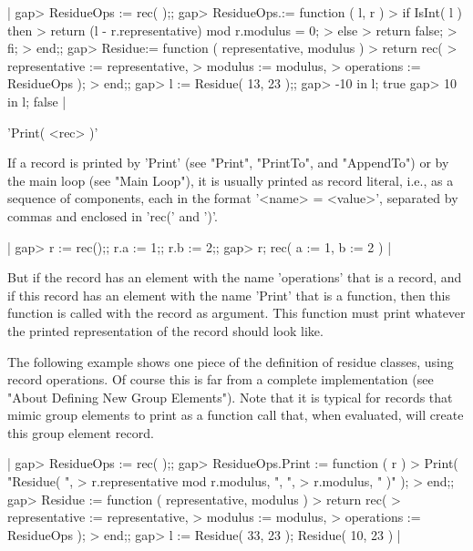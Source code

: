 |    gap> ResidueOps := rec( );;
    gap> ResidueOps.\in := function ( l, r )
    >   if IsInt( l )  then
    >     return (l - r.representative) mod r.modulus = 0;
    >   else
    >     return false;
    >   fi;
    > end;;
    gap> Residue:= function ( representative, modulus )
    >   return rec(
    >     representative := representative,
    >     modulus        := modulus,
    >     operations     := ResidueOps );
    > end;;
    gap> l := Residue( 13, 23 );;
    gap> -10 in l;
    true
    gap> 10 in l;
    false |


'Print( <rec> )'

If  a record   is  printed  by  'Print'  (see  "Print", "PrintTo",    and
"AppendTo") or by the main loop (see "Main Loop"),  it is usually printed
as record literal, i.e., as a sequence of components,  each in the format
'<name> \:= <value>', separated by commas and enclosed in 'rec(' and ')'.

|    gap> r := rec();;  r.a := 1;;  r.b := 2;;
    gap> r;
    rec(
      a := 1,
      b := 2 ) |

But  if the record  has an element with the   name 'operations' that is a
record, and if this record has an element with the name 'Print' that is a
function, then this function is called with the record as argument.  This
function must print whatever   the printed representation of the   record
should look like.

The following   example shows one piece  of   the definition  of  residue
classes, using record operations.  Of course this  is far from a complete
implementation (see "About Defining  New Group Elements").  Note that  it
is typical for records  that mimic group  elements to print as a function
call that, when evaluated, will create this group element record.

|    gap> ResidueOps := rec( );;
    gap> ResidueOps.Print := function ( r )
    >   Print( "Residue( ",
    >               r.representative mod r.modulus, ", ",
    >               r.modulus, " )" );
    > end;;
    gap> Residue := function ( representative, modulus )
    >   return rec(
    >     representative := representative,
    >     modulus        := modulus,
    >     operations     := ResidueOps );
    > end;;
    gap> l := Residue( 33, 23 );
    Residue( 10, 23 ) |

%

